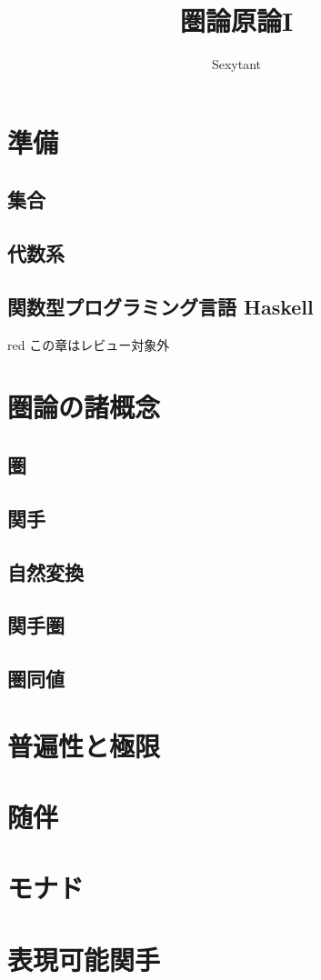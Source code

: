 \documentclass[dvipdfmx]{jsbook}
\title{圏論原論I}
\author{Sexytant}
\theoremstyle{plain}
\begin{document}
\setcounter{tocdepth}{2}
\maketitle
\tableofcontents
\newpage
\part{準備}
\chapter{集合}


\chapter{代数系}


\chapter{関数型プログラミング言語 Haskell}
\begin{color}{red}
この章はレビュー対象外
\end{color}
\begin{comment}

\end{comment}
\part{圏論の諸概念}
\chapter{圏}


\chapter{関手}


\chapter{自然変換}


\chapter{関手圏}


\chapter{圏同値}


\part{普遍性と極限}

\part{随伴}

\part{モナド}

\part{表現可能関手}

\printindex
\end{document}

